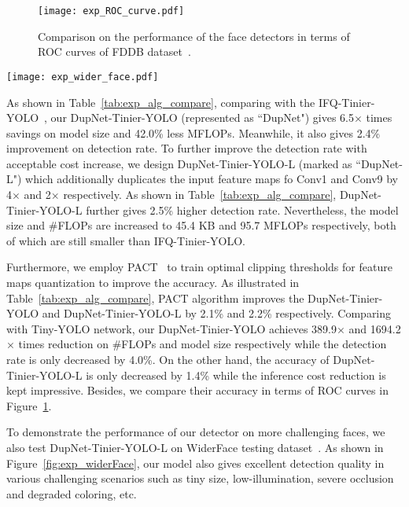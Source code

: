 \documentclass[10pt,twocolumn,letterpaper]{article}
\begin{document}
\begin{figure}[!htb]
	\begin{center}
		\texttt{[image: exp\_ROC\_curve.pdf]}
	\end{center}
	\caption{Comparison on the performance of the face detectors  in terms of ROC curves of FDDB dataset~\cite{FDDB}.}
	\label{fig:exp_alg_comp}
\end{figure}

\begin{figure*}[!htb]
	\centering
	\texttt{[image: exp\_wider\_face.pdf]}
	\caption{Qualitative results of the proposed DupNet-Tinier-YOLO-L face detector on Wider Face dataset~\cite{widerface}. }
	\label{fig:exp_widerFace}
\end{figure*}

As shown in Table~\ref{tab:exp_alg_compare}, comparing with the IFQ-Tinier-YOLO~\cite{IFQNet}, our DupNet-Tinier-YOLO (represented as ``DupNet") gives 6.5$\times$ times savings on model size and 42.0\%  less MFLOPs. Meanwhile, it also gives 2.4\% improvement on detection rate. To further improve the detection rate with acceptable cost increase, we design DupNet-Tinier-YOLO-L (marked as ``DupNet-L")  which additionally duplicates the input feature maps fo Conv1 and Conv9 by 4$\times$ and 2$\times$ respectively. As shown in Table~\ref{tab:exp_alg_compare},  DupNet-Tinier-YOLO-L further gives 2.5\% higher detection rate. Nevertheless, the model size and \#FLOPs are increased to 45.4 KB and 95.7 MFLOPs respectively, both of which are still smaller than IFQ-Tinier-YOLO.

Furthermore, we employ PACT~\cite{PACT} to train optimal clipping thresholds for feature maps quantization to improve the accuracy. As illustrated in Table~\ref{tab:exp_alg_compare}, PACT algorithm improves the DupNet-Tinier-YOLO and DupNet-Tinier-YOLO-L by 2.1\% and 2.2\% respectively. Comparing with Tiny-YOLO network, our DupNet-Tinier-YOLO achieves 389.9$\times$ and 1694.2$\times$ times reduction on \#FLOPs and model size respectively while the detection rate is only decreased by 4.0\%. On the other hand, the accuracy of DupNet-Tinier-YOLO-L is only decreased by 1.4\% while the inference cost reduction is kept impressive. Besides, we compare their accuracy in terms of ROC curves in Figure~\ref{fig:exp_alg_comp}.


To demonstrate the performance of our detector on more challenging faces, we also test DupNet-Tinier-YOLO-L on WiderFace testing dataset~\cite{widerface}. As shown in Figure~\ref{fig:exp_widerFace}, our model also gives excellent detection quality in various challenging scenarios such as tiny size, low-illumination, severe occlusion and degraded coloring, etc.
\end{document}

